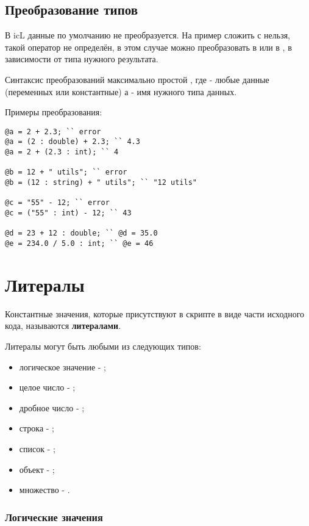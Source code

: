 \documentclass[a4paper, 14pt]{extarticle}
\newenvironment{icItems}
	{ \begin{itemize} [noitemsep,nolistsep] }
	{ \end{itemize} }
\begin{document}
\subsection{Преобразование типов}

В icL данные по умолчанию не преобразуется. На пример сложить \integer{} с \double{} нельзя, такой оператор не определён, в этом случае можно преобразовать \integer{} в \double{} или \double{} в \integer{}, в зависимости от типа нужного результата.

Синтаксис преобразований максимально простой , где  - любые данные (переменных или константные) а  - имя нужного типа данных.

\noindent Примеры преобразования:
\begin{lstlisting}
@a = 2 + 2.3; `` error
@a = (2 : double) + 2.3; `` 4.3
@a = 2 + (2.3 : int); `` 4

@b = 12 + " utils"; `` error
@b = (12 : string) + " utils"; `` "12 utils"

@c = "55" - 12; `` error
@c = ("55" : int) - 12; `` 43

@d = 23 + 12 : double; `` @d = 35.0
@e = 234.0 / 5.0 : int; `` @e = 46
\end{lstlisting}

\newpage
\section{Литералы}

Константные значения, которые присутствуют в скрипте в виде части исходного кода, называются {\bf литералами}.

Литералы могут быть любыми из следующих типов:

\begin{icItems}
	\item
		логическое значение - \bool{};
	\item
		целое число - \integer{};
	\item
		дробное число - \double{};
	\item
		строка - \str{};
	\item
		список - \listtype{};
	\item
		объект - \object{};
	\item
		множество - \set{}.
\end{icItems}

\subsubsection{Логические значения}
\end{document}
